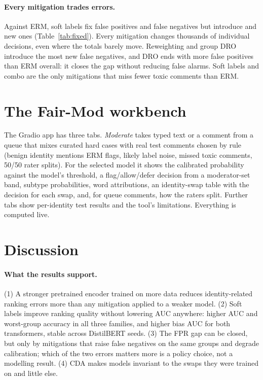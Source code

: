 
\paragraph{Every mitigation trades errors.} Against ERM, soft labels fix \FPFixed{} false positives and \FNFixed{}
false negatives but introduce \FPIntro{} and \FNIntro{} new ones (Table~\ref{tab:fixed}). Every mitigation changes
thousands of individual decisions, even where the totals barely move. Reweighting and group DRO introduce the most new
false negatives, and DRO ends with more false positives than ERM overall: it closes the gap without reducing false
alarms. Soft labels and combo are the only mitigations that miss fewer toxic comments than ERM.

\section{The Fair-Mod workbench}
\label{sec:system}
The Gradio app \citep{abid2019gradio} has three tabs. \emph{Moderate} takes typed text or a comment from a queue that
mixes curated hard cases with real test comments chosen by rule (benign identity mentions ERM flags, likely label
noise, missed toxic comments, 50/50 rater splits). For the selected model it shows the calibrated probability against
the model's threshold, a flag/allow/defer decision from a moderator-set band, subtype probabilities, word
attributions, an identity-swap table with the decision for each swap, and, for queue comments, how the raters split.
Further tabs show per-identity test results and the tool's limitations. Everything is computed live.

\section{Discussion}
\paragraph{What the results support.} (1) A stronger pretrained encoder trained on more data reduces identity-related
ranking errors more than any mitigation applied to a weaker model. (2) Soft labels improve ranking quality without lowering
AUC anywhere: higher AUC and worst-group accuracy in all three families, and higher bias AUC for both transformers,
stable across DistilBERT seeds. (3) The FPR gap can be closed, but only by mitigations that raise false negatives on
the same groups and degrade calibration; which of the two errors matters more is a policy choice, not a modelling
result. (4) CDA makes models invariant to the swaps they were trained on and little else.

